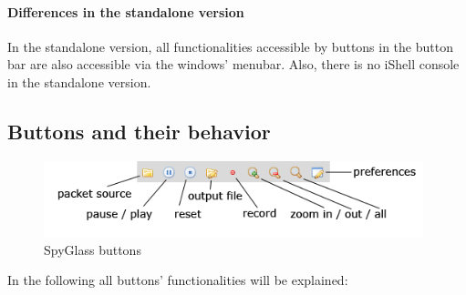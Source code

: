 		\paragraph{Differences in the standalone version}
			
			In the standalone version, all functionalities accessible by buttons in the button
			bar are also accessible via the windows’ menubar. Also, there is no iShell
			console in the standalone version.
			
	\subsection{Buttons and their behavior}
	\label{ssec:buttons_behaviour}

		\begin{figure}[htb]
			\begin{center}
				\includegraphics[width=11cm]{./pics/spyglass_buttons}
				\caption{SpyGlass buttons}
				\label{pic:spyglass_buttons}
			\end{center}
		\end{figure}

		In the following all buttons’ functionalities will be explained:
		
